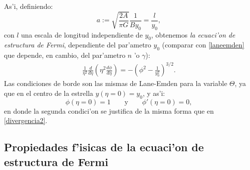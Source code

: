 As'i, definiendo:
\begin{equation}\label{ec-fermi-a}
 a:=\sqrt{\frac{2A}{\pi G}}\frac{1}{B y_0}=\frac{l}{y_0},
\end{equation}
con $l$ una escala de longitud independiente de $y_0$, obtenemos \emph{la ecuaci'on de estructura de Fermi}, dependiente del par'ametro $y_0$ (comparar con \eqref{laneemden} que depende, en cambio, del par'ametro $n$ 'o $\gamma$):
\begin{align}\label{ec-fermi2}
\boxed{
\frac{1}{\eta^2}\frac{d}{d\eta}\left(\eta^2\frac{d\phi}{d\eta}\right)=-\left(\phi^2-\frac{1}{y_0^2}\right)^{3/2}.}
\end{align}
Las condiciones de borde son las mismas de Lane-Emden para la variable $\Theta$, ya que en el centro de la estrella $y(\eta=0)=y_0$, y as'i:
\begin{equation}\label{bcs-fermi}
\phi(\eta=0)=1\qquad\text{y}\qquad \phi'(\eta=0)=0,
\end{equation}
en donde la segunda condici'on se justifica de la misma forma que en \eqref{divergencia2}.

\subsection{Propiedades f'isicas de la ecuaci'on de estructura de Fermi}


